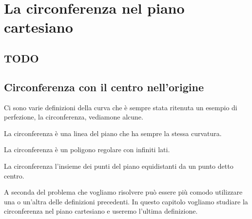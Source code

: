 


\chapter{La circonferenza nel piano cartesiano}

\section{TODO}

\section{Circonferenza con il centro nell'origine}
\label{sec:circ_circcentroorigine}

% 

Ci sono varie definizioni della curva che è sempre stata ritenuta un esempio di 
perfezione, la circonferenza, vediamone alcune.

\begin{definizione}%
 La circonferenza è una linea del piano che ha sempre la stessa curvatura.
\end{definizione}

\begin{definizione}%
 La circonferenza è un poligono regolare con infiniti lati.
\end{definizione}

\begin{definizione}%
 La circonferenza l'insieme dei punti del piano equidistanti da un punto detto 
centro.
\end{definizione}

A seconda del problema che vogliamo risolvere può essere più comodo utilizzare 
una o un'altra delle definizioni precedenti. In questo capitolo vogliamo 
studiare la circonferenza nel piano cartesiano e useremo l'ultima definizione.


